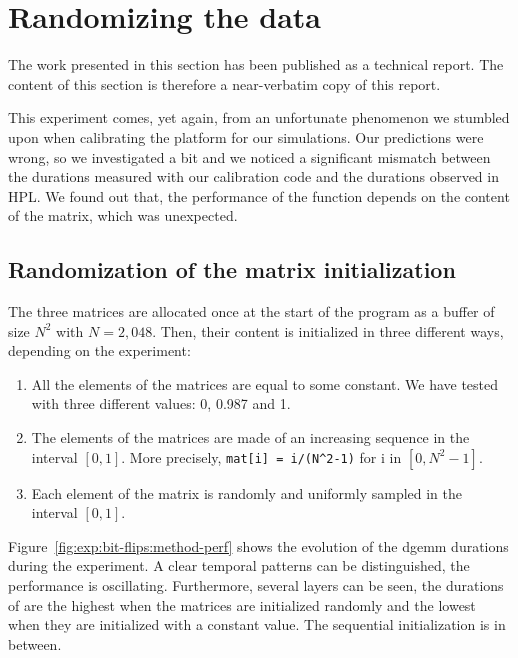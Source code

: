     \section{Randomizing the data}%
    \label{sec:randomizing_data}
        The work presented in this section has been published as a technical report\cite{cornebize:bitflips}. The
        content of this section is therefore a near-verbatim copy of this report.

        This experiment comes, yet again, from an unfortunate phenomenon we stumbled upon when calibrating the platform
        for our simulations. Our predictions were wrong, so we investigated a bit and we noticed a significant mismatch
        between the durations measured with our calibration code and the durations observed in HPL. We found out that,
        the performance of the \dgemm function depends on the content of the matrix, which was unexpected.

        \subsection{Randomization of the matrix initialization}
        \label{sub:randomization_matrix_initialization}
            The three matrices are allocated once at the start of the program as a buffer of size \(N^2\) with
            \(N=2,048\). Then, their content is initialized in three different ways, depending on the experiment:
            \begin{enumerate}
                \item All the elements of the matrices are equal to some constant. We have tested with three different
                    values: 0, 0.987 and 1.
                \item The elements of the matrices are made of an increasing sequence in the interval \([0, 1]\). More
                    precisely, \texttt{mat[i] = i/(N\textasciicircum{}2-1)} for i in \([0, N^2-1]\).
                \item Each element of the matrix is randomly and uniformly sampled in the interval \([0, 1]\).
            \end{enumerate}

        Figure~\ref{fig:exp:bit-flips:method-perf} shows the evolution of the dgemm durations during the experiment.
        A clear temporal patterns can be distinguished, the performance is oscillating.  Furthermore, several layers can
        be seen, the durations of \dgemm are the highest when the matrices are initialized randomly and the
        lowest when they are initialized with a constant value. The sequential initialization is in between.


